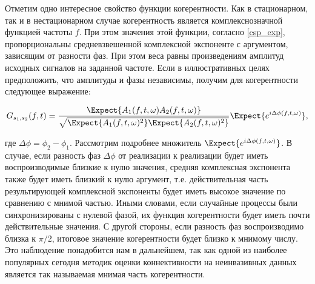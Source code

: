 Отметим одно интересное свойство функции когерентности.  Как в стационарном,
так и в нестационарном случае когерентность является комплекснозначной функцией
частоты $f$. При этом значения этой функции, согласно \ref{csp_exp},
пропорциональны средневзвешенной комплексной экспоненте с аргументом, зависящим
от разности фаз.  При этом веса равны произведениям амплитуд исходных сигналов
на заданной частоте.  Если в иллюстративных целях предположить, что амплитуды и
фазы независимы, получим для когерентности следующее выражение:

\begin{equation}
    G_{s_1,s_2}(f,t) =
    \frac{\Expect{A_1(f,t,\omega)A_2(f,t,\omega)}}
    {\sqrt{\Expect{A_1(f,t,\omega)^2}\Expect{A_2(f,t,\omega)^2}}}\Expect{e^{i\Delta\phi(f,t,\omega)}},
\end{equation}

где $\Delta\phi = \phi_2 - \phi_1$. Рассмотрим подробнее множитель
$\Expect{e^{i\Delta\phi(f,t,\omega)}}$.  В случае, если разность фаз
$\Delta\phi$ от реализации к реализации будет иметь воспроизводимые близкие к
нулю значения, средняя комплексная экспонента также будет иметь близкий к нулю
аргумент, т.е. действительная часть результирующей комплексной экспоненты будет
иметь высокое значение по сравнению с мнимой частью.  Иными словами, если
случайные процессы были синхронизированы с нулевой фазой, их функция
когерентности будет иметь почти действительные значения. С другой стороны, если
разность фаз воспроизводимо близка к $\pi/2$, итоговое значение когерентности
будет близко к мнимому числу.  Это наблюдение понадобится нам в дальнейшем, так
как одной из наиболее популярных сегодня методик оценки коннективности на
неинвазивных данных является так называемая мнимая часть когерентности.




